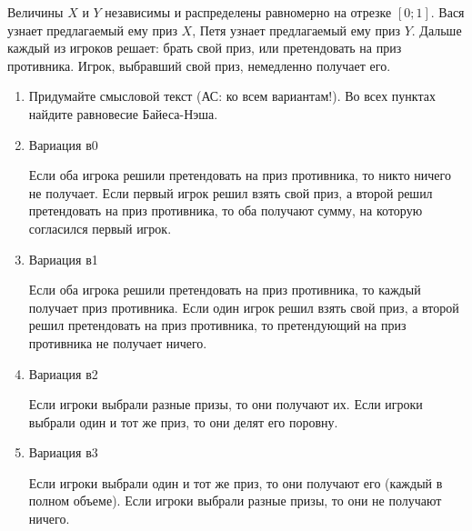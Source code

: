 \begin{problem}

Величины $X$ и $Y$ независимы и распределены равномерно на отрезке $[0;1]$. Вася узнает предлагаемый ему приз $X$, Петя узнает предлагаемый ему приз $Y$. Дальше каждый из игроков решает: брать  свой приз, или претендовать на приз противника. Игрок, выбравший свой приз, немедленно получает его.  \par
\begin{enumerate}
\item Придумайте смысловой текст ({\red АС: ко всем вариантам!}). Во всех пунктах найдите равновесие Байеса-Нэша. \par

\item Вариация в0 \par
Если оба игрока решили претендовать на приз противника, то никто ничего не получает. Если первый игрок решил взять свой приз, а второй решил претендовать на приз противника, то оба получают сумму, на которую согласился первый игрок. \par

\item  Вариация в1 \par

Если оба игрока решили претендовать на приз противника, то каждый получает приз противника. Если один игрок решил взять свой приз, а второй решил претендовать на приз противника, то претендующий на приз противника не получает ничего. \par

\item  Вариация в2 \par

Если игроки выбрали разные призы, то они получают их. Если игроки выбрали один и тот же приз, то они делят его поровну.\par

\item  Вариация в3 \par

Если игроки выбрали один и тот же приз, то они получают его (каждый в полном объеме). Если игроки выбрали разные призы, то они не получают ничего.\par
\end{enumerate}


\begin{sol}

\end{sol}
\end{problem}



